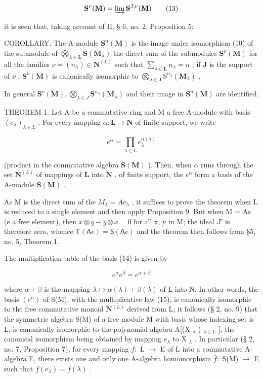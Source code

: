 \[
\mathbf {S} ^ {\nu} (\mathbf {M}) = \varinjlim \mathbf {S} ^ {\mathrm{J}, \nu} (\mathbf {M})\tag{13}
\]

it is seen that, taking account of II, § 6, no. 2, Proposition 5:

COROLLARY. The A-module \(\mathbf{S}^n (\mathbf{M})\) is the image under isomorphism (10) of the submodule of \(\bigotimes_{\lambda \in \mathbf{L}}\mathbf{S}(\mathbf{M}_{\lambda})\) the direct sum of the submodules \(\mathbf{S}^{\nu}(\mathbf{M})\) for all the families \(\nu = (n_{\lambda})\in \mathbf{N}^{(L)}\) such that \(\sum_{\lambda \in \mathbf{L}}n_{\lambda} = n\) ; if \(\mathbf{J}\) is the support of \(\nu\) , \(\mathbf{S}^{\nu}(\mathbf{M})\) is canonically isomorphic to \(\bigotimes_{\lambda \in \mathbf{J}}\mathrm{S}^{n_{\lambda}}(\mathbf{M}_{\lambda})\) .

In general \(\mathbf{S}^{\nu}(\mathbf{M}),\bigotimes_{\lambda \in J}\mathbf{S}^{n_{\lambda}}(\mathbf{M}_{\lambda})\) and their image in \(\mathbf{S}^n (\mathbf{M})\) are identified.

THEOREM 1. Let A be a commutative ring and M a free A-module with basis \((e_{\lambda})_{\lambda \in L}\) . For every mapping \(\alpha: \mathbf{L} \to \mathbf{N}\) of finite support, we write

\[
e ^ {\alpha} = \prod_ {\lambda \in L} e _ {\lambda} ^ {\alpha (\lambda)}\tag{14}
\]

(product in the commutative algebra \(\mathbf{S}(\mathbf{M})\) ). Then, when \(\alpha\) runs through the set \(\mathbf{N}^{(L)}\) of mappings of \(\mathbf{L}\) into \(\mathbf{N}\) , of finite support, the \(e^{\alpha}\) form a basis of the A-module \(\mathbf{S}(\mathbf{M})\) .

As M is the direct sum of the \(M_{\lambda} = Ae_{\lambda}\) , it suffices to prove the theorem when L is reduced to a single element and then apply Proposition 9. But when M = Ae (e a free element), then \(x \otimes y - y \otimes x = 0\) for all x, y in M; the ideal \(J'\) is therefore zero, whence \(\mathsf{T}(\mathsf{A}e) = \mathsf{S}(\mathsf{A}e)\) and the theorem then follows from §5, no. 5, Theorem 1.

The multiplication table of the basis (14) is given by

\[
e ^ {\alpha} e ^ {\beta} = e ^ {\alpha + \beta}\tag{15}
\]

where \(\alpha + \beta\) is the mapping \(\lambda \mapsto \alpha(\lambda) + \beta(\lambda)\) of L into N. In other words, the basis \((e^{\alpha})\) of S(M), with the multiplicative law (15), is canonically isomorphic to the free commutative monoid \(\mathbf{N}^{(L)}\) derived from L; it follows (§ 2, no. 9) that the symmetric algebra S(M) of a free module M with basis whose indexing set is L, is canonically isomorphic to the polynomial algebra A{[}(X \(_{\lambda}\) ) \(_{\lambda \in L}\) {]}, the canonical isomorphism being obtained by mapping \(e_{\lambda}\) to X \(_{\lambda}\) . In particular (§ 2, no. 7, Proposition 7), for every mapping \(f\colon\) L \(\to\) E of L into a commutative A-algebra E, there exists one and only one A-algebra homomorphism \(\bar{f}\colon\) S(M) \(\to\) E such that \(\bar{f}(e_{\lambda}) = f(\lambda)\) .

